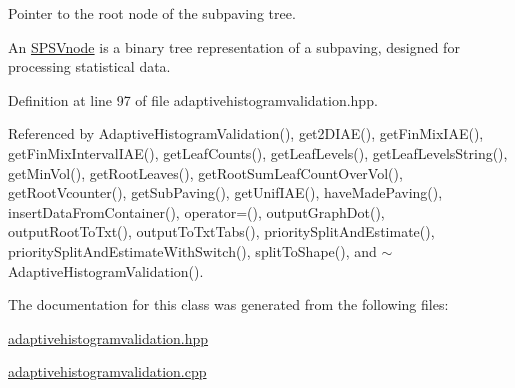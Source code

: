 \-Pointer to the root node of the subpaving tree. 

\-An \hyperlink{classsubpavings_1_1SPSVnode}{\-S\-P\-S\-Vnode} is a binary tree representation of a subpaving, designed for processing statistical data. 

\-Definition at line 97 of file adaptivehistogramvalidation.\-hpp.



\-Referenced by \-Adaptive\-Histogram\-Validation(), get2\-D\-I\-A\-E(), get\-Fin\-Mix\-I\-A\-E(), get\-Fin\-Mix\-Interval\-I\-A\-E(), get\-Leaf\-Counts(), get\-Leaf\-Levels(), get\-Leaf\-Levels\-String(), get\-Min\-Vol(), get\-Root\-Leaves(), get\-Root\-Sum\-Leaf\-Count\-Over\-Vol(), get\-Root\-Vcounter(), get\-Sub\-Paving(), get\-Unif\-I\-A\-E(), have\-Made\-Paving(), insert\-Data\-From\-Container(), operator=(), output\-Graph\-Dot(), output\-Root\-To\-Txt(), output\-To\-Txt\-Tabs(), priority\-Split\-And\-Estimate(), priority\-Split\-And\-Estimate\-With\-Switch(), split\-To\-Shape(), and $\sim$\-Adaptive\-Histogram\-Validation().



\-The documentation for this class was generated from the following files\-:\begin{DoxyCompactItemize}
\item 
\hyperlink{adaptivehistogramvalidation_8hpp}{adaptivehistogramvalidation.\-hpp}\item 
\hyperlink{adaptivehistogramvalidation_8cpp}{adaptivehistogramvalidation.\-cpp}\end{DoxyCompactItemize}
